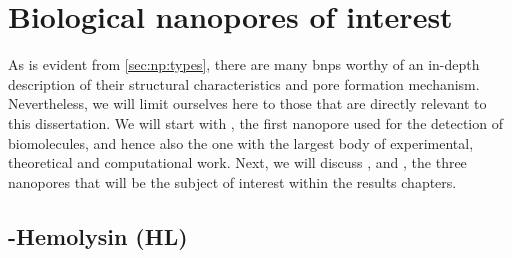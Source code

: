 %
%
\section{Biological nanopores of interest}
%
\label{sec:np:interest}

As is evident from \cref{sec:np:types}, there are many \glspl{bnp} worthy of an in-depth description of their
structural characteristics and pore formation mechanism. Nevertheless, we will limit ourselves here to those
that are directly relevant to this dissertation. We will start with , the first nanopore used
for the detection of biomolecules, and hence also the one with the largest body of experimental, theoretical
and computational work. Next, we will discuss ,  and , the three
nanopores that will be the subject of interest within the results chapters.


\subsection[Alpha-Hemolysin (aHL)]{\ta-Hemolysin (\ta{}HL)}
%
\label{sec:np:ahl}
%

